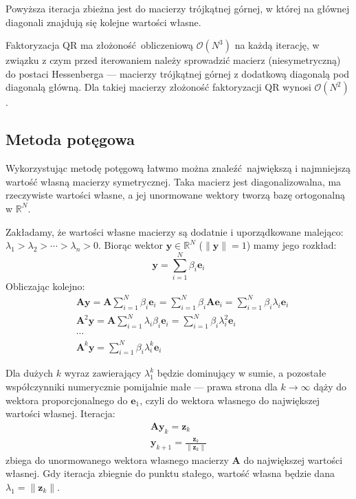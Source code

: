 \documentclass[a4paper,11pt]{article}
\begin{document}
Powyższa iteracja zbieżna jest do macierzy trójkątnej górnej, w której na
głównej diagonali znajdują się kolejne wartości własne.

Faktoryzacja QR ma złożoność obliczeniową \(\mathcal{O}(N^3)\) na każdą
iterację, w związku z czym przed iterowaniem należy sprowadzić macierz
(niesymetryczną) do postaci Hessenberga --- macierzy trójkątnej  górnej
z dodatkową diagonalą pod diagonalą główną. Dla takiej macierzy złożoność
faktoryzacji QR wynosi \(\mathcal{O}(N^2)\).

\subsection{Metoda potęgowa}

Wykorzystując metodę potęgową łatwmo można znaleźć największą i najmniejszą
wartość własną macierzy symetrycznej. Taka macierz jest diagonalizowalna,
ma rzeczywiste wartości własne, a jej unormowane wektory tworzą bazę ortogonalną
w \(\mathbb{R}^N\).

Zakładamy, że wartości własne macierzy są dodatnie i uporządkowane malejąco:
\(\lambda_1 > \lambda_2 > \cdots > \lambda_n > 0\).
Biorąc wektor \(\mathbf{y}\in\mathbb{R}^N\) (\( \|\mathbf{y}\|=1\)) mamy
jego rozkład:
\begin{equation}
    \mathbf{y} = \sum_{i=1}^{N}\beta_i \mathbf{e}_i
\end{equation}
Obliczając kolejno:
\begin{equation}
    \begin{aligned}
        & \mathbf{A}\mathbf{y} = 
            \mathbf{A}\sum_{i=1}^{N}\beta_i \mathbf{e}_i = 
            \sum_{i=1}^{N}\beta_i \mathbf{A}\mathbf{e}_i = 
            \sum_{i=1}^{N}\beta_i\lambda_i \mathbf{e}_i \\
        & \mathbf{A}^2\mathbf{y} = 
            \mathbf{A}\sum_{i=1}^{N}\lambda_i\beta_i \mathbf{e}_i = 
            \sum_{i=1}^{N}\beta_i\lambda_i^2 \mathbf{e}_i \\
        & \cdots \\
        & \mathbf{A}^k\mathbf{y} =
            \sum_{i=1}^{N}\beta_i\lambda_i^k\mathbf{e}_i
    \end{aligned}
\end{equation}

Dla dużych \(k\) wyraz zawierający \(\lambda_1^k\) będzie dominujący w sumie,
a pozostałe współczynniki numerycznie pomijalnie małe --- prawa strona dla
\(k\to\infty \) dąży do wektora proporcjonalnego do \(\mathbf{e}_1\), czyli do
wektora własnego do największej wartości własnej.
Iteracja:
\begin{equation}
    \begin{gathered}
        \mathbf{A}\mathbf{y}_k = \mathbf{z}_k \\
        \mathbf{y}_{k+1} = \frac{\mathbf{z}_k}{\|\mathbf{z}_k\|}
    \end{gathered}
\end{equation}
zbiega do unormowanego wektora własnego macierzy \(\mathbf{A}\) do największej
wartości własnej. Gdy iteracja zbiegnie do punktu stałego, wartość własna będzie
dana \(\lambda_1=\|\mathbf{z}_k\| \).
\end{document}
